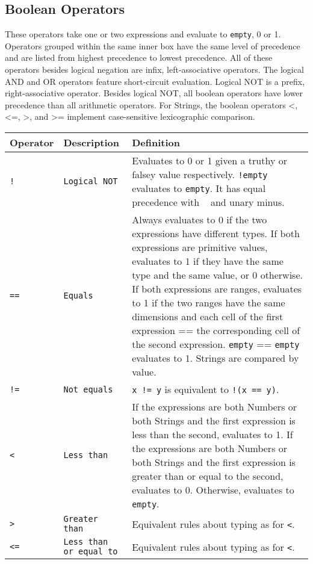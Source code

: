 		\subsection{Boolean Operators}
			These operators take one or two expressions and evaluate to \texttt{empty}, 0 or 1. Operators grouped within the same inner box have the same level of precedence and are listed from highest precedence to lowest precedence. All of these operators besides logical negation are infix, left-associative operators. The logical AND and OR operators feature short-circuit evaluation. Logical NOT is a prefix, right-associative operator. Besides logical NOT, all boolean operators have lower precedence than all arithmetic operators. For Strings, the boolean operators <, <=, >, and >= implement case-sensitive lexicographic comparison.
			\begin{longtable}[H]{ |p{2cm}|p{5cm}|p{7cm}|  }
			\hline
			\textbf{Operator} & \textbf{Description} & \textbf{Definition} \\ \hline
			\rule{0pt}{3ex}\texttt{!} & \texttt{Logical NOT} & {Evaluates to 0 or 1 given a truthy or falsey value respectively. \texttt{!empty} evaluates to \texttt{empty}. It has equal precedence with ~ and unary minus.} \\ \hline
			\rule{0pt}{3ex}\texttt{==} & \texttt{Equals} & {Always evaluates to 0 if the two expressions have different types. If both expressions are primitive values, evaluates to 1 if they have the same type and the same value, or 0 otherwise. If both expressions are ranges, evaluates to 1 if the two ranges have the same dimensions and each cell of the first expression == the corresponding cell of the second expression. \texttt{empty} == \texttt{empty} evaluates to 1. Strings are compared by value.} \\
			\rule{0pt}{3ex}\texttt{!=} & \texttt{Not equals} & {\texttt{x != y} is equivalent to \texttt{!(x == y)}.} \\
			\rule{0pt}{3ex}\texttt{<} & \texttt{Less than} & {If the expressions are both Numbers or both Strings and the first expression is less than the second, evaluates to 1. If the expressions are both Numbers or both Strings and the first expression is greater than or equal to the second, evaluates to 0. Otherwise, evaluates to \texttt{empty}.} \\
			\rule{0pt}{3ex}\texttt{>} & \texttt{Greater than} & {Equivalent rules about typing as for \texttt{<}.} \\
			\rule{0pt}{3ex}\texttt{<=} & \texttt{Less than or equal to} & {Equivalent rules about typing as for \texttt{<}.} \\

\end{longtable}
